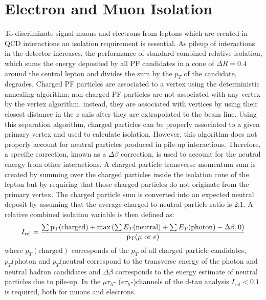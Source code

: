\section{Electron and Muon Isolation}
To discriminate signal muons and electrons from leptons
which are created in QCD interactions an isolation requirement is essential. 
As pileup of interactions in the detector increases, the performance of standard
combined relative isolation, which sums the 
energy deposited by all PF candidates in a cone of $\Delta R = 0.4$ around the central
lepton and divides the sum by the $p_{T}$ of 
the candidate, degrades. Charged PF particles are associated to
a vertex using the deterministic annealing algorithm; non charged PF particles
are not associated with any vertex by the vertex algorithm, instead,
they are associated with vertices by using their closest distance in the
$z$ axis after they are extrapolated to the beam line. Using this separation algorithm,
charged particles can be properly associated to a given primary vertex
and used to calculate isolation. However, this algorithm does not
properly account for neutral particles produced in pile-up interactions. 
Therefore, a specific correction, known as a $\Delta \beta$ correction, is
used to account for the neutral energy from other interactions.
A charged particle transverse momentum sum is created by summing over
the charged particles inside the isolation cone of the lepton but by
requiring that those charged particles do not originate from the primary vertex.
The charged particle sum is converted into an expected neutral deposit by
assuming that the average charged to neutral particle ratio is 2:1.
A relative combined isolation variable is then defined as:
\begin{equation}
I_{\rm rel} = \frac{\sum{\mathrm{p_{T}}(\mathrm{charged})} + \max\left(\sum{E_{T}(\mathrm{neutral})} + \sum{E_{T}(\mathrm{photon})} - \Delta\beta, 0\right)}{\mathrm{p_{T}}(\mu \, \, \mathrm{or} \,\, e)}
\label{eq:relIso}
\end{equation}
where $p_{T}(\mathrm{charged})$ corresponds of the $p_{T}$ 
of all charged particle candidates, $p_{T}(\mathrm{photon}$
and $p_{T}(\mathrm{neutral}$ correspond to the transverse 
energy of the photon and neutral hadron candidates
and $\Delta\beta$ corresponds to the energy estimate of neutral particles due to pile-up.
In the $\mu\tau_{h}$- ($e\tau_{h}$-)channels of the d-tau 
analysis $I_{\mathrm{rel}}<0.1$ is required, both for muons and electrons. 

